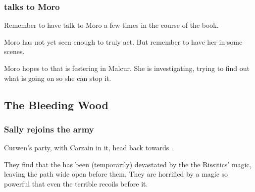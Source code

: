 \begin{garbage}





\subsubsection{\Tiroco{} talks to Moro}
Remember to have \Tiroco{} talk to Moro \Cornel{} a few times in the course of the book.

Moro has not yet seen enough to truly act. But remember to have her in some scenes. 

Moro hopes to  that is festering in Malcur. 
She is investigating, trying to find out what is going on so she can stop it. 








\subsection{The Bleeding Wood}
\subsubsection{Sally rejoins the army}
Curwen's party, with Carzain in it, head back towards \Forklin. 

They find that the \Wylde{} has been (temporarily) devastated by the the Rissitics' magic, leaving the path wide open before them. They are horrified by a magic so powerful that even the terrible \Wylde{} recoils before it. 


\end{garbage}
